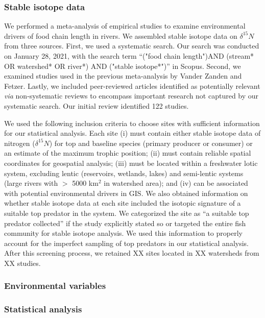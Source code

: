 \documentclass[11pt, class=article, crop=false]{standalone}
\begin{document}
\subsubsection{Stable isotope data}

We performed a meta-analysis of empirical studies to examine environmental drivers of food chain length in rivers.
We assembled stable isotope data on $\delta^{15} N$ from three sources.
First, we used a systematic search. 
Our search was conducted on January 28, 2021, with the search term ``("food chain length")AND (stream* OR watershed* OR river*) AND ("stable isotope*")'' in Scopus.
Second, we examined studies used in the previous meta-analysis by Vander Zanden and Fetzer.
Lastly, we included peer-reviewed articles identified as potentially relevant \textit{via} non-systematic reviews to encompass important research not captured by our systematic search.
Our initial review identified 122 studies.

We used the following inclusion criteria to choose sites with sufficient information for our statistical analysis.
Each site (i) must contain either stable isotope data of nitrogen ($\delta^{15}N$) for top and baseline species (primary producer or consumer) or an estimate of the maximum trophic position; 
(ii) must contain reliable spatial coordinates for geospatial analysis; 
(iii) must be located within a freshwater lotic system, excluding lentic (reservoirs, wetlands, lakes) and semi-lentic systems (large rivers with $>$ 5000 km$^2$ in watershed area); and (iv) can be associated with potential environmental drivers in GIS.
We also obtained information on whether stable isotope data at each site included the isotopic signature of a suitable top predator in the system.
We categorized the site as ``a suitable top predator collected'' if the study explicitly stated so or targeted the entire fish community for stable isotope analysis.
We used this information to properly account for the imperfect sampling of top predators in our statistical analysis.
After this screening process, we retained XX sites located in XX watersheds from XX studies. 

\subsubsection{Environmental variables}

\subsubsection{Statistical analysis}
\end{document}
